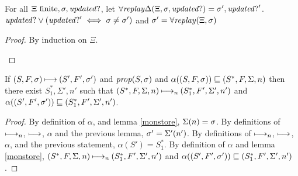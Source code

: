 \documentclass{llncs}
\newcommand{\prop}{\mathit{prop}}
\begin{document}
\begin{lemma}
For all $\Xi \text{ finite}, \sigma, \mathit{updated?}$, let $\forall\mathit{replay}\Delta(\Xi,\sigma,\mathit{updated?}) = \sigma',\mathit{updated?}'$.
$\mathit{updated?} \vee (\mathit{updated?}' \iff \sigma \neq \sigma')$ and $\sigma' = \forall\mathit{replay}(\Xi,\sigma)$
\end{lemma}
\begin{proof}
By induction on $\Xi$.
\begin{byCases}
\end{byCases}
\end{proof}

\begin{theorem}
If $(S,F,\sigma) \mathbin{\longmapsto} (S',F',\sigma')$ and $\prop(S,\msto)$ and $\alpha((S,F,\sigma))
\sqsubseteq (S^*,F,\Sigma,n)$ then there exist $S^*_1,\Sigma',n'$ such
that $(S^*,F,\Sigma,n) \mathbin{\longmapsto_n} (S^*_1,F',\Sigma',n')$ and
$\alpha((S',F',\sigma')) \sqsubseteq (S^*_1,F',\Sigma',n')$.
\end{theorem}
\begin{proof}
By definition of $\alpha$, and lemma \ref{monstore}, $\Sigma(n) = \sigma$.
By definitions of $\mathbin{\longmapsto_n}$, $\mathbin{\longmapsto}$, $\alpha$ and the previous lemma, $\sigma' = \Sigma'(n')$.
By definitions of $\mathbin{\longmapsto_n}$, $\mathbin{\longmapsto}$, $\alpha$, and the previous statement, $\alpha(S') = S^*_1$.
By definition of $\alpha$ and lemma \ref{monstore}, $(S^*,F,\Sigma,n) \mathbin{\longmapsto_n} (S^*_1,F',\Sigma',n')$ and $\alpha((S',F',\sigma')) \sqsubseteq (S^*_1,F',\Sigma',n')$.
\end{proof}
\end{document}
